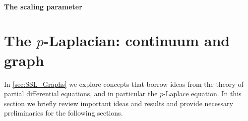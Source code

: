 \begin{figure}

\end{figure}
%
%
%
\paragraph{The scaling parameter}


%
%
%
%
%
%
%
\section{The $p$-Laplacian: continuum and graph}\label{sec:pLap}
%
In \cref{sec:SSL_Graphs} we explore concepts that borrow ideas from the theory of partial differential equations, and
in particular the $p$-Laplace equation. In this section we briefly review important ideas and results and provide 
necessary preliminaries for the following sections.
%
%
%
